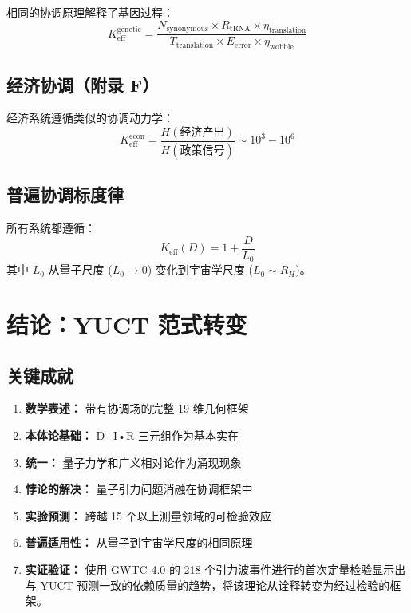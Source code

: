 \documentclass[11pt,a4paper]{article}
\theoremstyle{remark}
\newcommand{\Keff}{K_{\mathrm{eff}}}
\begin{document}
	相同的协调原理解释了基因过程：
	\[
	K_{\text{eff}}^{\text{genetic}} = \frac{N_{\text{synonymous}} \times R_{\text{tRNA}} \times \eta_{\text{translation}}}{T_{\text{translation}} \times E_{\text{error}} \times \eta_{\text{wobble}}}
	\]
	
	\subsection{经济协调（附录 F）}
	
	经济系统遵循类似的协调动力学：
	\[
	K_{\text{eff}}^{\text{econ}} = \frac{H(\text{经济产出})}{H(\text{政策信号})} \sim 10^3-10^6
	\]
	
	\subsection{普遍协调标度律}
	
	所有系统都遵循：
	\[
	\boxed{\Keff(D) = 1 + \frac{D}{L_0}}
	\]
	其中 $L_0$ 从量子尺度 ($L_0 \to 0$) 变化到宇宙学尺度 ($L_0 \sim R_H$)。
	
	\section{结论：YUCT 范式转变}
	\label{sec:conclusion}
	
	\subsection{关键成就}
	
	\begin{enumerate}
		\item \textbf{数学表述：} 带有协调场的完整 19 维几何框架
		
		\item \textbf{本体论基础：} D+I•R 三元组作为基本实在
		
		\item \textbf{统一：} 量子力学和广义相对论作为涌现现象
		
		\item \textbf{悖论的解决：} 量子引力问题消融在协调框架中
		
		\item \textbf{实验预测：} 跨越 15 个以上测量领域的可检验效应
		
		\item \textbf{普遍适用性：} 从量子到宇宙学尺度的相同原理
		
		\item \textbf{实证验证：} 使用 GWTC-4.0 的 218 个引力波事件进行的首次定量检验显示出与 YUCT 预测一致的依赖质量的趋势，将该理论从诠释转变为经过检验的框架。
	\end{enumerate}
	
\end{document}
